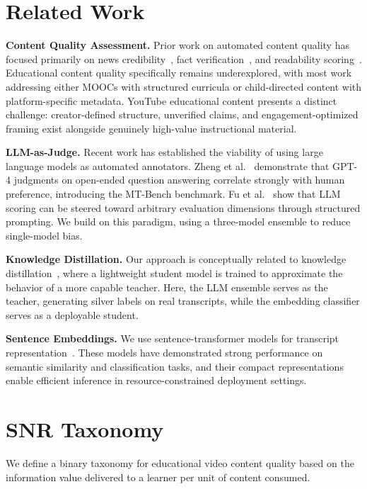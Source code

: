 \documentclass[11pt,a4paper]{article}
\begin{document}
\section{Related Work}

\textbf{Content Quality Assessment.} Prior work on automated content quality has focused
primarily on news credibility~\cite{rashkin2017}, fact verification~\cite{thorne2018}, and
readability scoring~\cite{pitler2008}. Educational content quality specifically remains
underexplored, with most work addressing either MOOCs with structured curricula or
child-directed content with platform-specific metadata. YouTube educational content presents a
distinct challenge: creator-defined structure, unverified claims, and engagement-optimized
framing exist alongside genuinely high-value instructional material.

\textbf{LLM-as-Judge.} Recent work has established the viability of using large language models
as automated annotators. Zheng et al.~\cite{zheng2023} demonstrate that GPT-4 judgments on
open-ended question answering correlate strongly with human preference, introducing the MT-Bench
benchmark. Fu et al.~\cite{fu2023} show that LLM scoring can be steered toward arbitrary
evaluation dimensions through structured prompting. We build on this paradigm, using a
three-model ensemble to reduce single-model bias.

\textbf{Knowledge Distillation.} Our approach is conceptually related to knowledge
distillation~\cite{hinton2015}, where a lightweight student model is trained to approximate the
behavior of a more capable teacher. Here, the LLM ensemble serves as the teacher, generating
silver labels on real transcripts, while the embedding classifier serves as a deployable student.

\textbf{Sentence Embeddings.} We use sentence-transformer models for transcript
representation~\cite{reimers2019}. These models have demonstrated strong performance on semantic
similarity and classification tasks, and their compact representations enable efficient inference
in resource-constrained deployment settings.

\section{SNR Taxonomy}

We define a binary taxonomy for educational video content quality based on the information value
delivered to a learner per unit of content consumed.
\end{document}
